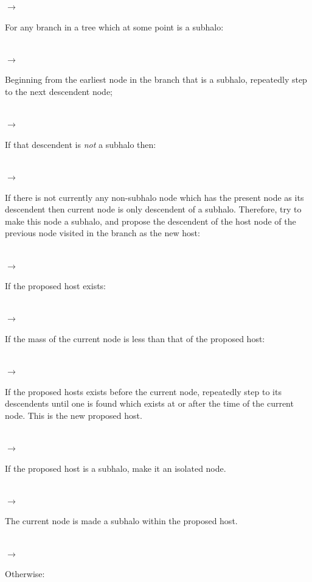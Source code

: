 \noindent\hspace{ 5mm} $\rightarrow$ \parbox[t]{150mm}{For any branch in a tree which at some point is a subhalo:}\\

\noindent\hspace{10mm} $\rightarrow$ \parbox[t]{145mm}{Beginning from the earliest node in the branch that is a subhalo, repeatedly step to the next descendent node;}\\

\noindent\hspace{10mm} $\rightarrow$ \parbox[t]{145mm}{If that descendent is \emph{not} a subhalo then:}\\

\noindent\hspace{15mm} $\rightarrow$ \parbox[t]{140mm}{If there is not currently any non-subhalo node which has the present node as its descendent then current node is only descendent of a subhalo. Therefore, try to make this node a subhalo, and propose the descendent of the host node of the previous node visited in the branch as the new host:}\\

\noindent\hspace{20mm} $\rightarrow$ \parbox[t]{135mm}{If the proposed host exists:}\\

\noindent\hspace{25mm} $\rightarrow$ \parbox[t]{130mm}{If the mass of the current node is less than that of the proposed host:}\\

\noindent\hspace{30mm} $\rightarrow$ \parbox[t]{125mm}{If the proposed hosts exists before the current node, repeatedly step to its descendents until one is found which exists at or after the time of the current node. This is the new proposed host.}\\

\noindent\hspace{30mm} $\rightarrow$ \parbox[t]{125mm}{If the proposed host is a subhalo, make it an isolated node.}\\

\noindent\hspace{30mm} $\rightarrow$ \parbox[t]{125mm}{The current node is made a subhalo within the proposed host.}\\

\noindent\hspace{25mm} $\rightarrow$ \parbox[t]{130mm}{Otherwise:}\\

